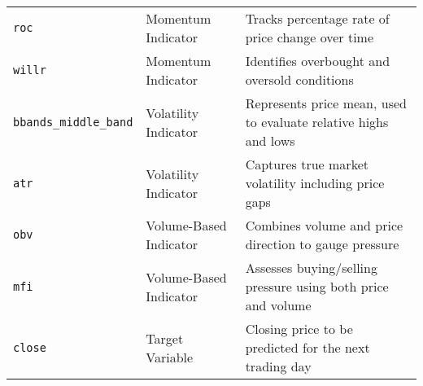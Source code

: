 \begin{table}[H]
\begin{tabular}{llp{6cm}}
\texttt{roc}                & Momentum Indicator             & Tracks percentage rate of price change over time \\
\texttt{willr}              & Momentum Indicator             & Identifies overbought and oversold conditions \\ 
\texttt{bbands\_middle\_band} & Volatility Indicator         & Represents price mean, used to evaluate relative highs and lows \\ 
\texttt{atr}                & Volatility Indicator           & Captures true market volatility including price gaps \\ 
\texttt{obv}                & Volume-Based Indicator         & Combines volume and price direction to gauge pressure \\ 
\texttt{mfi}                & Volume-Based Indicator         & Assesses buying/selling pressure using both price and volume \\ 
\texttt{close}              & Target Variable                & Closing price to be predicted for the next trading day \\ \hline
\end{tabular}
\end{table}
